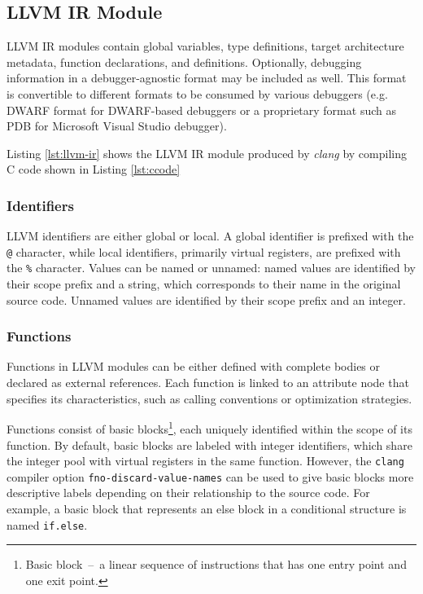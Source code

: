 \subsection{LLVM IR Module}

LLVM IR modules contain global variables, type definitions, target architecture metadata, function declarations, and definitions. Optionally, debugging information in a debugger-agnostic format may be included as well. This format is convertible to different formats to be consumed by various debuggers (e.g. DWARF format for DWARF-based debuggers or a proprietary format such as PDB for Microsoft Visual Studio debugger).

Listing \ref{lst:llvm-ir} shows the LLVM IR module produced by \emph{clang} by compiling C code shown in Listing \ref{lst:ccode}



\subsubsection{Identifiers}

LLVM identifiers are either global or local. A global identifier is prefixed with the \texttt{@} character, while local identifiers, primarily virtual registers, are prefixed with the \texttt{\%} character. Values can be named or unnamed: named values are identified by their scope prefix and a string, which corresponds to their name in the original source code. Unnamed values are identified by their scope prefix and an integer.


\subsubsection{Functions}
Functions in LLVM modules can be either defined with complete bodies or declared as external references. Each function is linked to an attribute node that specifies its characteristics, such as calling conventions or optimization strategies.

Functions consist of basic blocks\footnote{Basic block \,--\, a linear sequence of instructions that has one entry point and one exit point.}, each uniquely identified within the scope of its function. By default, basic blocks are labeled with integer identifiers, which share the integer pool with virtual registers in the same function. However, the \texttt{clang} compiler option \texttt{fno-discard-value-names} can be used to give basic blocks more descriptive labels depending on their relationship to the source code. For example, a basic block that represents an else block in a conditional structure is named \texttt{if.else}.


